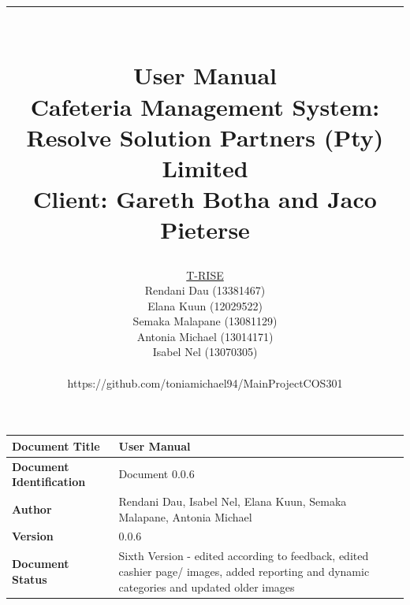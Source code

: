 \documentclass[a4paper,12pt]{report}
\title{ \rule{\textwidth}{1pt}  \\ \Huge User Manual \\ 
	\Large Cafeteria Management System: Resolve Solution Partners (Pty) Limited \\
	\small Client: Gareth Botha and Jaco Pieterse}
\author{
         \underline{T-RISE}\\
          Rendani Dau (13381467) \\
	Elana Kuun (12029522) \\
	Semaka Malapane (13081129) \\
	Antonia Michael (13014171) \\
	Isabel Nel (13070305) \\ \\
	https://github.com/toniamichael94/MainProjectCOS301 \\ }
\date{\today \\ \rule{\textwidth}{1pt}}
\begin{document}
\maketitle
\break

\tableofcontents
\break


 \begin{tabu} to 0.8\textwidth { | X[l] | X[l] | }
 \hline
 \textbf{Document Title} & User Manual \\
 \hline
 \textbf{Document Identification}  & Document 0.0.6  \\
 \hline
 \textbf{Author}  & Rendani Dau, Isabel Nel, Elana Kuun, Semaka Malapane, Antonia Michael \\
 \hline
 \textbf{Version} & 0.0.6 \\
 \hline
 \textbf{Document Status} & Sixth Version - edited according to feedback, edited cashier page/ images, added reporting and dynamic categories and updated older images\\
 \hline
 \end{tabu}
\end{document}
